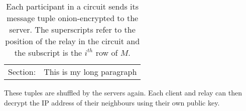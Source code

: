{\renewcommand{\arraystretch}{2}
\begin{table}[h]
\centering
	\begin{tabularx}{\textwidth}{lX}
	    Section:   &  This is my     \newline
	                  long paragraph \\
	\end{tabularx}

  \caption{Each participant in a circuit sends its message 
  tuple onion-encrypted to the server. The superscripts refer to the position 
  of the relay in the circuit and the subscript is the $i^{th}$ row of $M$.}
\end{table}



These tuples are shuffled by the servers again. Each client and relay can then 
decrypt the IP address of their neighbours using their own public key.

}
